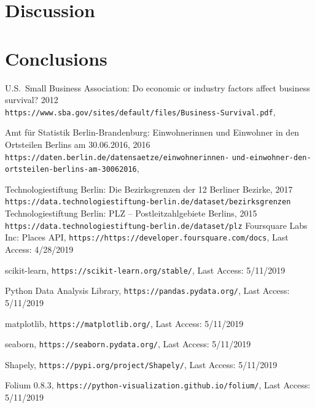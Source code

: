 \documentclass[letter]{scrartcl}
\begin{document}
\section{Discussion}


\section{Conclusions}

\begin{thebibliography}{9}
U.S.~Small Business Association: Do economic or industry factors affect business survival? 2012 \\
\texttt{https://www.sba.gov/sites/default/files/Business-Survival.pdf}, 

Amt für Statistik Berlin-Brandenburg: Einwohnerinnen und Einwohner in den Ortsteilen Berlins am 30.06.2016, 2016 \\
\texttt{https://daten.berlin.de/datensaetze/einwohnerinnen-}
\texttt{und-einwohner-den-ortsteilen-berlins-am-30062016},   

 Technologiestiftung Berlin: Die Bezirksgrenzen der 12 Berliner Bezirke, 2017\\
 \texttt{https://data.technologiestiftung-berlin.de/dataset/bezirksgrenzen}  
 Technologiestiftung Berlin: PLZ -- Postleitzahlgebiete Berlins, 2015\\
 \texttt{https://data.technologiestiftung-berlin.de/dataset/plz}
 Foursquare Labs Inc: Places API, \texttt{https://https://developer.foursquare.com/docs}, Last Access: 4/28/2019
 
scikit-learn, \texttt{https://scikit-learn.org/stable/}, Last Access: 5/11/2019

Python Data Analysis Library, \texttt{https://pandas.pydata.org/}, Last Access: 5/11/2019

matplotlib, \texttt{https://matplotlib.org/}, Last Access: 5/11/2019

seaborn, \texttt{https://seaborn.pydata.org/}, Last Access: 5/11/2019

Shapely, \texttt{https://pypi.org/project/Shapely/}, Last Access: 5/11/2019

Folium 0.8.3, \texttt{https://python-visualization.github.io/folium/}, Last Access: 5/11/2019


\end{thebibliography}
\end{document}
